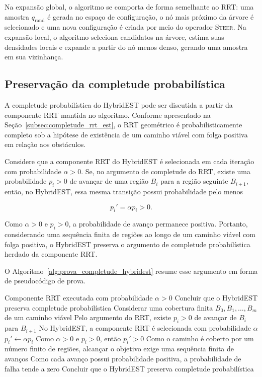 Na expansão global, o algoritmo se comporta de forma semelhante ao RRT: uma amostra $q_{\mathrm{rand}}$ é gerada no espaço de configuração, o nó mais próximo da árvore é selecionado e uma nova configuração é criada por meio do operador \textsc{Steer}. Na expansão local, o algoritmo seleciona candidatos na árvore, estima suas densidades locais e expande a partir do nó menos denso, gerando uma amostra em sua vizinhança.

\subsection{Preservação da completude probabilística}
\label{subsec:completude_hybridest}

A completude probabilística do HybridEST pode ser discutida a partir da componente RRT mantida no algoritmo. Conforme apresentado na Seção~\ref{subsec:completude_rrt_est}, o RRT geométrico é probabilisticamente completo sob a hipótese de existência de um caminho viável com folga positiva em relação aos obstáculos.

Considere que a componente RRT do HybridEST é selecionada em cada iteração com probabilidade $\alpha > 0$. Se, no argumento de completude do RRT, existe uma probabilidade $p_i > 0$ de avançar de uma região $B_i$ para a região seguinte $B_{i+1}$, então, no HybridEST, essa mesma transição possui probabilidade pelo menos

\begin{equation}
    p_i' = \alpha p_i > 0.
    \label{eq:probabilidade_hybridest}
\end{equation}

Como $\alpha > 0$ e $p_i > 0$, a probabilidade de avanço permanece positiva. Portanto, considerando uma sequência finita de regiões ao longo de um caminho viável com folga positiva, o HybridEST preserva o argumento de completude probabilística herdado da componente RRT.

O Algoritmo~\ref{alg:prova_completude_hybridest} resume esse argumento em forma de pseudocódigo de prova.

\begin{algorithm}[H]
\caption{Esquema de preservação da completude probabilística do HybridEST}
\label{alg:prova_completude_hybridest}
\begin{algorithmic}[1]
\Require Componente RRT executada com probabilidade $\alpha > 0$
\Ensure Concluir que o HybridEST preserva completude probabilística
\State Considerar uma cobertura finita $B_0, B_1, \ldots, B_m$ de um caminho viável
    \State Pelo argumento do RRT, existe $p_i > 0$ de avançar de $B_i$ para $B_{i+1}$
    \State No HybridEST, a componente RRT é selecionada com probabilidade $\alpha$
    \State $p_i' \gets \alpha p_i$
    \State Como $\alpha > 0$ e $p_i > 0$, então $p_i' > 0$
\EndFor
\State Como o caminho é coberto por um número finito de regiões, alcançar o objetivo exige uma sequência finita de avanços
\State Como cada avanço possui probabilidade positiva, a probabilidade de falha tende a zero
\State Concluir que o HybridEST preserva completude probabilística
\end{algorithmic}
\end{algorithm}

